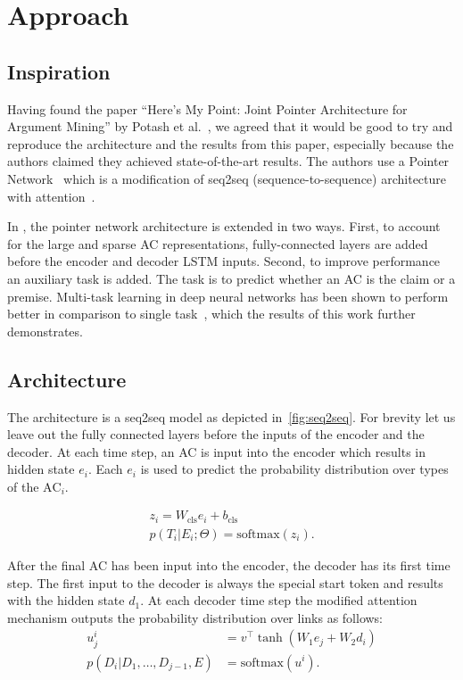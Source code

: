 \documentclass[onecolumn]{article}
\begin{document}
\section{Approach}
\subsection{Inspiration}
Having found the paper ``Here's My Point: Joint Pointer Architecture for Argument Mining'' by Potash et al.~\cite{potash2017here}, we agreed that it
would be good to try and reproduce the architecture and the results from this paper, especially because the authors claimed they achieved
state-of-the-art results. The authors use a Pointer Network~\cite{pn} which is a modification of seq2seq (sequence-to-sequence) architecture~\cite{seq2seq} with attention~\cite{attention}.

In \cite{potash2017here}, the pointer network architecture is extended in two ways.
First, to account for the large and sparse AC representations, fully-connected layers are added before the encoder and decoder LSTM inputs.
Second, to improve performance an auxiliary task is added. The task is to predict whether an AC is the claim or a premise.
Multi-task learning in deep neural networks has been shown to perform better in comparison to single task~\cite{multi}, which the results of this work further demonstrates.

\subsection{Architecture}
The architecture is a seq2seq model as depicted in~\autoref{fig:seq2seq}.
For brevity let us leave out the fully connected layers before the inputs of the encoder and the decoder.
At each time step, an AC is input into the encoder which results in hidden state $e_i$.
Each $e_i$ is used to predict the probability distribution over types of the $\text{AC}_i$.

\begin{align*}
    z_i = W_{\text{cls}} e_i + b_{\text{cls}}\\
    p(T_i|E_i;\Theta) = \text{softmax}(z_i).
\end{align*}


After the final AC has been input into the encoder, the decoder has its first time step.
The first input to the decoder is always the special start token and results with the hidden state $d_1$.
At each decoder time step the modified attention mechanism outputs the probability distribution over links as follows:
\begin{align*}
    u_j^i &= v^\top \tanh(W_1e_j + W_2d_i)\\
    p(D_i|D_1,\dots,D_{j-1},E) &= \text{softmax}(u^i).
\end{align*}
\end{document}

